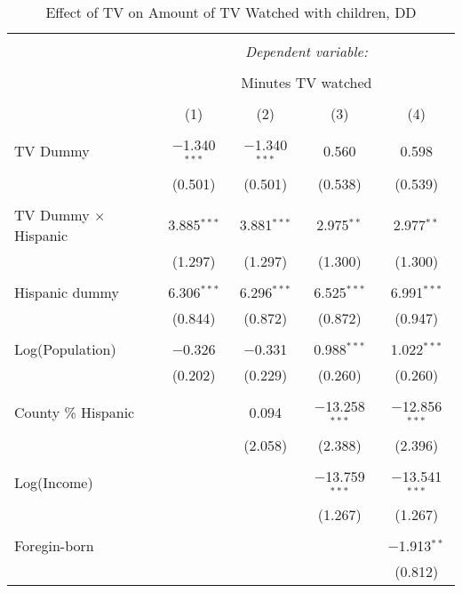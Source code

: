 
\begin{table}[!htbp] \centering 
  \caption{Effect of TV on Amount of TV Watched with children, DD} 
  \label{} 
\begin{tabular}{@{\extracolsep{-5pt}}lcccc} 
\\[-1.8ex]\hline 
\hline \\[-1.8ex] 
 & \multicolumn{4}{c}{\textit{Dependent variable:}} \\ 
\cline{2-5} 
\\[-1.8ex] & \multicolumn{4}{c}{Minutes TV watched} \\ 
\\[-1.8ex] & (1) & (2) & (3) & (4)\\ 
\hline \\[-1.8ex] 
 TV Dummy & $-$1.340$^{***}$ & $-$1.340$^{***}$ & 0.560 & 0.598 \\ 
  & (0.501) & (0.501) & (0.538) & (0.539) \\ 
  & & & & \\ 
 TV Dummy $\times$ Hispanic  & 3.885$^{***}$ & 3.881$^{***}$ & 2.975$^{**}$ & 2.977$^{**}$ \\ 
  & (1.297) & (1.297) & (1.300) & (1.300) \\ 
  & & & & \\ 
 Hispanic dummy & 6.306$^{***}$ & 6.296$^{***}$ & 6.525$^{***}$ & 6.991$^{***}$ \\ 
  & (0.844) & (0.872) & (0.872) & (0.947) \\ 
  & & & & \\ 
 Log(Population) & $-$0.326 & $-$0.331 & 0.988$^{***}$ & 1.022$^{***}$ \\ 
  & (0.202) & (0.229) & (0.260) & (0.260) \\ 
  & & & & \\ 
 County \% Hispanic &  & 0.094 & $-$13.258$^{***}$ & $-$12.856$^{***}$ \\ 
  &  & (2.058) & (2.388) & (2.396) \\ 
  & & & & \\ 
 Log(Income) &  &  & $-$13.759$^{***}$ & $-$13.541$^{***}$ \\ 
  &  &  & (1.267) & (1.267) \\ 
  & & & & \\ 
 Foregin-born &  &  &  & $-$1.913$^{**}$ \\ 
  &  &  &  & (0.812) \\ 

\end{tabular}
\end{table}
